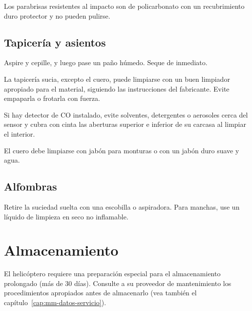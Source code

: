 \begin{nota}
Los parabrisas resistentes al impacto son de policarbonato con un recubrimiento duro protector y no pueden pulirse.
\end{nota}

\subsection{Tapicería y asientos}

\begin{pasos}
\item Aspire y cepille, y luego pase un paño húmedo. Seque de inmediato.
\item La tapicería sucia, excepto el cuero, puede limpiarse con un buen limpiador apropiado para el material, siguiendo las instrucciones del fabricante. Evite empaparla o frotarla con fuerza.
\end{pasos}

\begin{precaucion}
Si hay detector de CO instalado, evite solventes, detergentes o aerosoles cerca del sensor y cubra con cinta las aberturas superior e inferior de su carcasa al limpiar el interior.
\end{precaucion}

\begin{pasos}
\setcounter{enumi}{2}
\item El cuero debe limpiarse con jabón para monturas o con un jabón duro suave y agua.
\end{pasos}

\subsection{Alfombras}

Retire la suciedad suelta con una escobilla o aspiradora. Para manchas, use un líquido de limpieza en seco no inflamable.

\section{Almacenamiento}

El helicóptero requiere una preparación especial para el almacenamiento prolongado (más de 30 días). Consulte a su proveedor de mantenimiento los procedimientos apropiados antes de almacenarlo (vea también el capítulo~\ref{cap:mm-datos-servicio}).
